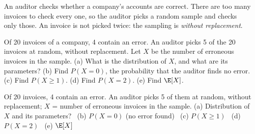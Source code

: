 
\begin{problem}
	\begin{context}
		An auditor checks whether a company's accounts are correct. There are
		too many invoices to check every one, so the auditor picks a random
		sample and checks only those. An invoice is not picked twice: the
		sampling is \emph{without replacement}.
	\end{context}
	Of 20 invoices of a company, 4 contain an error. An auditor picks 5 of the
	20 invoices at random, without replacement. Let $X$ be the number of
	erroneous invoices in the sample.
	(a) What is the distribution of $X$, and what are its parameters?
	(b) Find $P(X=0)$, the probability that the auditor finds no error.
	(c) Find $P(X\ge1)$.
	(d) Find $P(X=2)$.
	(e) Find $\E[X]$.
\end{problem}

\begin{slideproblem}
	Of 20 invoices, 4 contain an error. An auditor picks 5 of them at random,
	without replacement; $X$ = number of erroneous invoices in the sample.
	(a) Distribution of $X$ and its parameters? \ (b) $P(X=0)$ (no error
	found) \ (c) $P(X\ge1)$ \ (d) $P(X=2)$ \ (e) $\E[X]$
\end{slideproblem}

